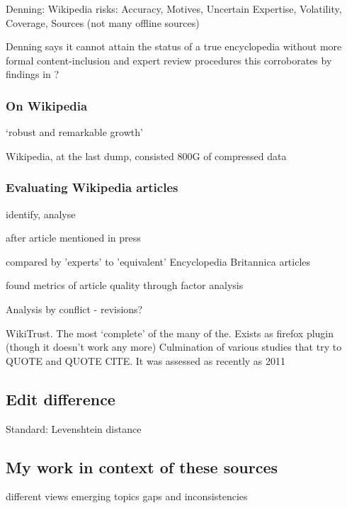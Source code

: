 \documentclass[a4paper,11pt,twoside,notitlepage]{article}
\begin{document}
        Denning: Wikipedia risks: Accuracy, Motives, Uncertain Expertise,
        Volatility, Coverage, Sources (not many offline sources)
        \cite{Denning2005} 

        Denning says it cannot attain the status of a true
        encyclopedia without more formal content-inclusion and expert
        review procedures\cite{Denning2005} this corroborates by
        findings in \cite{Giles2005}?

        \subsubsection{On Wikipedia}
        `robust and remarkable growth'
        \cite{Kittur2007}\cite{Voss2005} 
        
        Wikipedia, at the last dump, consisted 800G of compressed data
        \cite{wiki-dump}

        \subsubsection{Evaluating Wikipedia articles}
        identify, analyse

        after article mentioned in press \cite{Lih2004}

        compared by 'experts' to 'equivalent' Encyclopedia Britannica articles \cite{Giles2005}

        found metrics of article quality through factor analysis
        \cite{Stvilia2005}

        Analysis by conflict - revisions?\cite{Kittur2007}

        WikiTrust. The most `complete' of the many of the. Exists as
        firefox plugin (though it doesn't work any more) Culmination
        of various studies that try to QUOTE \cite{Adler2007} and QUOTE CITE. It
        was assessed as recently as 2011 \cite{Lucassen2011}
       
        \subsection{Edit difference}

        Standard: Levenshtein distance \cite{Levenshtein1966}
        
        \subsection{My work in context of these sources}
        different views
        emerging topics
        gaps and inconsistencies
\end{document}
